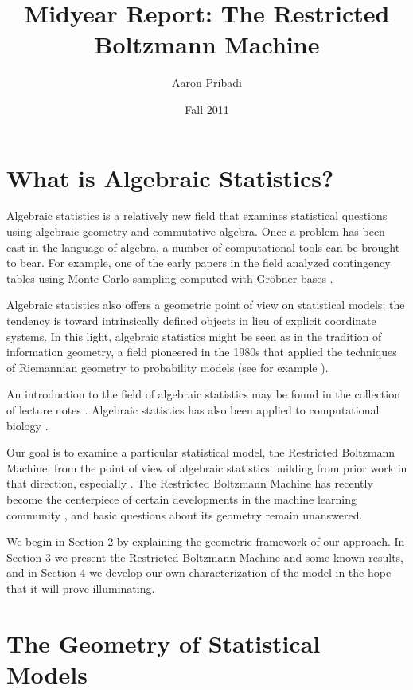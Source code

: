 \documentclass[11pt,titlepage]{article}
\title{Midyear Report: The Restricted Boltzmann Machine}
\author{Aaron Pribadi}
\date{Fall 2011}
\numberwithin{equation}{section}
\begin{document}
\maketitle

\tableofcontents

\pagebreak

\section{What is Algebraic Statistics?}

    Algebraic statistics is a relatively new field that examines statistical
    questions using algebraic geometry and commutative algebra.  Once a problem
    has been cast in the language of algebra, a number of computational tools
    can be brought to bear.  For example, one of the early papers in the field
    analyzed contingency tables using Monte Carlo sampling computed with Gröbner
    bases \cite{DS98}.

    Algebraic statistics also offers a geometric point of view on statistical
    models; the tendency is toward intrinsically defined objects in lieu of
    explicit coordinate systems.  In this light, algebraic statistics might be
    seen as in the tradition of information geometry, a field pioneered in the
    1980s that applied the techniques of Riemannian geometry to probability
    models (see for example \cite{Ama}).

    An introduction to the field of algebraic statistics may be found in the
    collection of lecture notes \cite{DSS08}.  Algebraic statistics has also
    been applied to computational biology \cite{ASCB}.

    Our goal is to examine a particular statistical model, the Restricted
    Boltzmann Machine, from the point of view of algebraic statistics building
    from prior work in that direction, especially \cite{CMS09}.  The Restricted
    Boltzmann Machine has recently become the centerpiece of certain
    developments in the machine learning community \cite{Hin07}, and basic
    questions about its geometry remain unanswered.  
    
    We begin in Section 2 by explaining the geometric framework of our approach.
    In Section 3 we present the Restricted Boltzmann Machine and some known
    results, and in Section 4 we develop our own characterization of the model
    in the hope that it will prove illuminating.

\section{The Geometry of Statistical Models}
\end{document}
